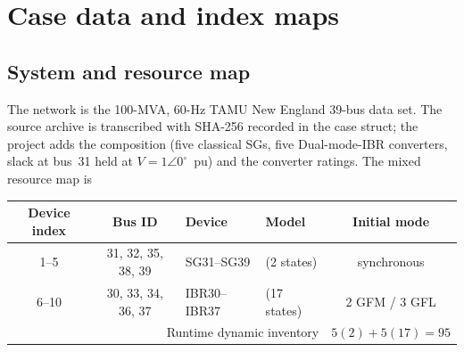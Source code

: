 \documentclass[12pt,a4paper]{article}
\newcommand{\code}[1]{\texttt{\detokenize{#1}}}
\begin{document}
\section{Case data and index maps}

\subsection{System and resource map}

The network is the 100-MVA, 60-Hz TAMU New England 39-bus data set.  The
source archive is transcribed with SHA-256 recorded in the case struct; the
project adds the composition (five classical SGs, five Dual-mode-IBR converters,
slack at bus~31 held at $V=1\angle 0^\circ$~pu) and the converter ratings.  The
mixed resource map is
\begin{center}\footnotesize
\begin{tabular}{ccllc}
\toprule
Device index & Bus ID & Device & Model & Initial mode\\
\midrule
1--5  & 31, 32, 35, 38, 39 & SG31--SG39 & \code{sg_classical} (2 states) & synchronous\\
6--10 & 30, 33, 34, 36, 37 & IBR30--IBR37 & \code{Dual-mode-IBR} (17 states) & 2 GFM / 3 GFL\\
\midrule
\multicolumn{4}{r}{Runtime dynamic inventory} & \multicolumn{1}{c}{$5(2)+5(17)=95$}\\
\bottomrule
\end{tabular}
\end{center}
\end{document}
